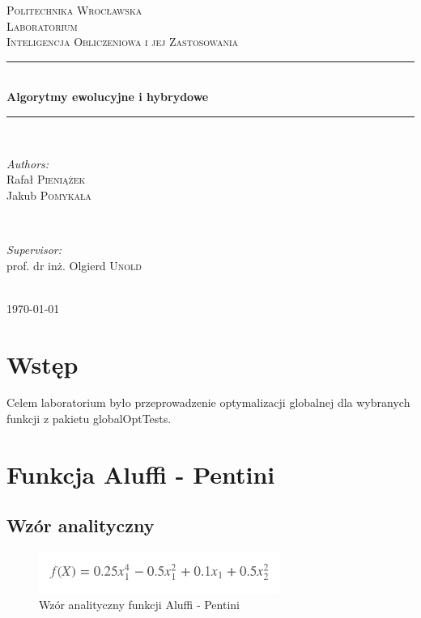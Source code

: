 \documentclass{article}
\begin{document}
	
	\begin{titlepage}
		\center
		\newcommand{\HRule}{\rule{\linewidth}{0.6mm}}
		
		\textsc{\LARGE Politechnika Wrocławska}\\[1.5cm]
		\textsc{\Large Laboratorium}\\[0.5cm] 
		\textsc{\large Inteligencja Obliczeniowa i jej Zastosowania}\\[0.7cm] 

		\HRule \\[0.4cm]
		{ \huge \bfseries Algorytmy ewolucyjne i hybrydowe}\\[0.4cm]
		\HRule \\[1.5cm]
		
		\begin{minipage}{0.4\textwidth}
			\begin{flushleft} \large
				\emph{Authors:}\\
				Rafał \textsc{Pieniążek}\\
                Jakub \textsc{Pomykała}
			\end{flushleft}
		\end{minipage}
		~
		\begin{minipage}{0.4\textwidth}
			\begin{flushright} \large
				\emph{Supervisor:} \\
				prof. dr inż. Olgierd \textsc{Unold} 
			\end{flushright}
		\end{minipage}\\[4cm]

		{\large \today}\\[3cm]
		
		\vfill
		
	\end{titlepage}


\newpage
\section{Wstęp}
	Celem laboratorium było przeprowadzenie optymalizacji globalnej dla wybranych funkcji z pakietu globalOptTests.
    


\section{Funkcja Aluffi - Pentini}
	\subsection{Wzór analityczny}
	   \begin{figure}[!htbp]
    \centering
    \includegraphics[width=0.7\textwidth]{inc/wzory/aluffi-pentini}
     \caption{Wzór analityczny funkcji Aluffi - Pentini}
    \end{figure}
    
\end{document}
